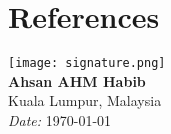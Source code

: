 \documentclass[11pt,a4paper]{moderncv}
\begin{document}
\section{References}

\vspace{2em}
\texttt{[image: signature.png]}\\
\textbf{Ahsan AHM Habib}\\
Kuala Lumpur, Malaysia \\
\textit{Date:} \today
\end{document}
